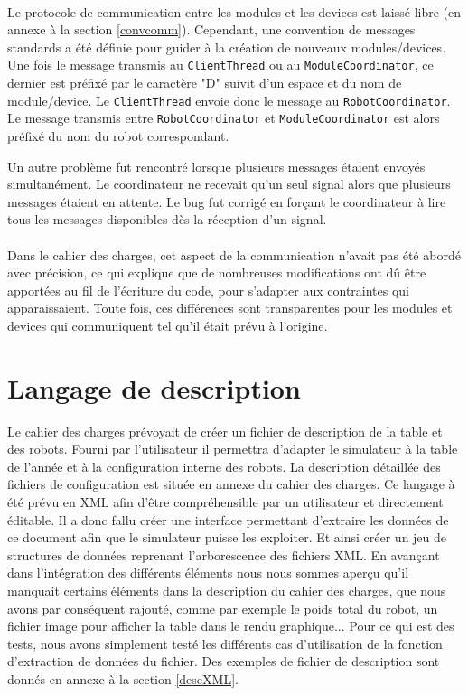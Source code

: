 \paragraph{}

Le protocole de communication entre les modules et les devices est laissé libre (en annexe à la section \ref{convcomm}). Cependant, une convention de messages standards a été définie pour guider à la création de nouveaux modules/devices.
Une fois le message transmis au \texttt{ClientThread} ou au \texttt{ModuleCoordinator}, ce dernier est préfixé par le caractère "D" suivit d'un espace et du nom de module/device. Le \texttt{ClientThread} envoie donc le message au \texttt{RobotCoordinator}.
Le message transmis entre \texttt{RobotCoordinator} et \texttt{ModuleCoordinator} est alors préfixé du nom du robot correspondant.

Un autre problème fut rencontré lorsque plusieurs messages étaient envoyés simultanément. Le coordinateur ne recevait qu'un seul signal alors que plusieurs messages étaient en attente. Le bug fut corrigé en forçant le coordinateur à lire tous les messages disponibles dès la réception d'un signal.

\paragraph{}
Dans le cahier des charges, cet aspect de la communication n'avait pas été abordé avec précision, ce qui explique que de nombreuses modifications ont dû être apportées au fil de l'écriture du code, pour s'adapter aux contraintes qui apparaissaient. Toute fois, ces différences sont transparentes pour les modules et devices qui communiquent tel qu'il était prévu à l'origine.

\section{Langage de description}

Le cahier des charges prévoyait de créer un fichier de description de la table et des robots. Fourni par l'utilisateur il permettra d'adapter le simulateur à la table de l'année et à la configuration interne des robots. La description détaillée des fichiers de configuration est située en annexe du cahier des charges. Ce langage à été prévu en XML afin d'être compréhensible par un utilisateur et directement éditable. Il a donc fallu créer une interface permettant d'extraire les données de ce document afin que le simulateur puisse les exploiter. Et ainsi créer un jeu de structures de données reprenant l'arborescence des fichiers XML. En avançant dans l'intégration des différents éléments nous nous sommes aperçu qu'il manquait certains éléments dans la description du cahier des charges, que nous avons par conséquent rajouté, comme par exemple le poids total du robot, un fichier image pour afficher la table dans le rendu graphique... Pour ce qui est des tests, nous avons simplement testé les différents cas d'utilisation de la fonction d'extraction de données du fichier. Des exemples de fichier de description sont donnés en annexe à la section \ref{descXML}.





